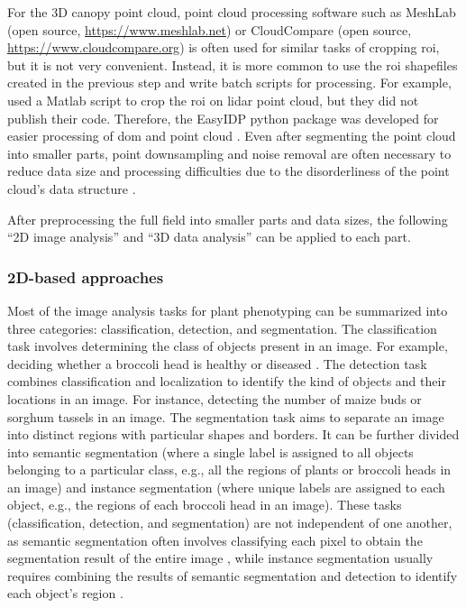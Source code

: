 For the 3D canopy point cloud, point cloud processing software such as MeshLab (open source, \url{https://www.meshlab.net}) or CloudCompare (open source, \url{https://www.cloudcompare.org}) is often used for similar tasks of cropping \gls{roi}, but it is not very convenient. Instead, it is more common to use the \gls{roi} shapefiles created in the previous step and write batch scripts for processing. For example, \citet{sun_field_2018} used a Matlab script to crop the \gls{roi} on \gls{lidar} point cloud, but they did not publish their code. Therefore, the EasyIDP python package was developed for easier processing of \gls{dom} and point cloud \citep{wang_easyidp_2021}. Even after segmenting the point cloud into smaller parts, point downsampling and noise removal are often necessary to reduce data size and processing difficulties due to the disorderliness of the point cloud's data structure \citep{ma_calculation_2019}.

After preprocessing the full field into smaller parts and data sizes, the following ``2D image analysis'' and ``3D data analysis'' can be applied to each part.

\subsubsection{2D-based approaches}

Most of the image analysis tasks for plant phenotyping can be summarized into three categories: classification, detection, and segmentation. The classification task involves determining the class of objects present in an image. For example, deciding whether a broccoli head is healthy or diseased \citep{garcia_towards_2021}. The detection task combines classification and localization to identify the kind of objects and their locations in an image. For instance, detecting the number of maize buds \citep{liu_estimating_2022} or sorghum tassels \citep{ghosal_weakly_2019} in an image. The segmentation task aims to separate an image into distinct regions with particular shapes and borders. It can be further divided into semantic segmentation (where a single label is assigned to all objects belonging to a particular class, e.g., all the regions of plants or broccoli heads in an image) and instance segmentation (where unique labels are assigned to each object, e.g., the regions of each broccoli head in an image). These tasks (classification, detection, and segmentation) are not independent of one another, as semantic segmentation often involves classifying each pixel to obtain the segmentation result of the entire image \citep{guo_easypcc_2017}, while instance segmentation usually requires combining the results of semantic segmentation and detection to identify each object's region \citep[see Fig.~2]{luling_using_2021}.

